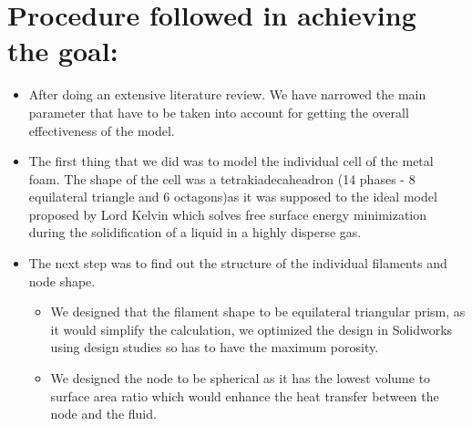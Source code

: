\documentclass[compileTAMUreport.tex]{subfiles}
\begin{document}
\chapter{Procedure followed in achieving the goal:}
\begin{itemize}
\item After doing an extensive literature review. We have narrowed the main parameter that have to be taken into account for getting the overall effectiveness of the model.
\item The first thing that we did was to model the individual cell of the metal foam. The shape of the cell was a tetrakiadecaheadron (14 phases - 8 equilateral triangle and 6 octagons)as it was supposed to the ideal model proposed by Lord Kelvin which solves free surface energy minimization during the solidification of a liquid in a highly disperse gas.
\item The next step was to find out the structure of the individual filaments and node shape.

\begin{itemize}

\item We designed that the filament shape to be equilateral triangular prism, as it would simplify the calculation, we optimized the design in Solidworks using design studies so has to have the maximum porosity.
\item We designed the node to be spherical as it has the lowest volume to surface area ratio which would enhance the heat transfer between the node and the fluid.
\end{itemize}



\end{itemize}
\end{document}
